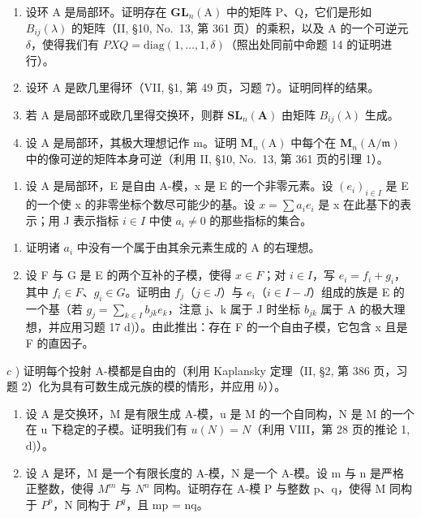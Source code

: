 \begin{enumerate}
\def\labelenumi{\alph{enumi})}
\item
  设环 A 是局部环。证明存在 \(\mathbf{GL}_{n}(\mathrm{A})\) 中的矩阵 P、Q，它们是形如 \(B_{ij}(\lambda)\) 的矩阵（II, §10, No.~13, 第 361 页）的乘积，以及 A 的一个可逆元 \(\delta\)，使得我们有 \(PXQ = \text{diag}(1, \ldots, 1, \delta)\)（照出处同前中命题 14 的证明进行）。
\item
  设环 A 是欧几里得环（VII, §1, 第 49 页，习题 7）。证明同样的结果。
\item
  若 \(\mathrm{A}\) 是局部环或欧几里得交换环，则群 \(\mathbf{S}\mathbf{L}_n(\mathbf{A})\) 由矩阵 \(B_{ij}(\lambda)\) 生成。
\item
  设 A 是局部环，其极大理想记作 m。证明 \(\mathbf{M}_{n}(\mathrm{A})\) 中每个在 \(\mathbf{M}_{n}(\mathrm{A}/\mathfrak{m})\) 中的像可逆的矩阵本身可逆（利用 II, §10, No.~13, 第 361 页的引理 1）。
\end{enumerate}

\begin{enumerate}
\def\labelenumi{\arabic{enumi})}
\setcounter{enumi}{17}
\tightlist
\item
  设 A 是局部环，E 是自由 A-模，x 是 E 的一个非零元素。设 \((e_{i})_{i\in I}\) 是 E 的一个使 x 的非零坐标个数尽可能少的基。设 \(x=\sum a_{i}e_{i}\) 是 x 在此基下的表示；用 J 表示指标 \(i\in I\) 中使 \(a_{i}\neq0\) 的那些指标的集合。
\end{enumerate}

\begin{enumerate}
\def\labelenumi{\alph{enumi})}
\tightlist
\item
  证明诸 \(a_{i}\) 中没有一个属于由其余元素生成的 A 的右理想。
\item
  设 F 与 G 是 E 的两个互补的子模，使得 \(x \in F\)；对 \(i \in I\)，写 \(e_{i} = f_{i} + g_{i}\)，其中 \(f_{i} \in F\)、\(g_{i} \in G\)。证明由 \(f_{j}\)（\(j \in J\)）与 \(e_{i}\)（\(i \in I - J\)）组成的族是 E 的一个基（若 \(g_{j} = \sum_{k \in I} b_{jk} e_{k}\)，注意 j、k 属于 J 时坐标 \(b_{jk}\) 属于 A 的极大理想，并应用习题 17 d)）。由此推出：存在 F 的一个自由子模，它包含 x 且是 F 的直因子。
\end{enumerate}

\(c\) ) 证明每个投射 A-模都是自由的（利用 Kaplansky 定理（II, §2, 第 386 页，习题 2）化为具有可数生成元族的模的情形，并应用 \(b\)））。

\begin{enumerate}
\def\labelenumi{\arabic{enumi})}
\setcounter{enumi}{18}
\item
  设 A 是交换环，M 是有限生成 A-模，u 是 M 的一个自同构，N 是 M 的一个在 u 下稳定的子模。证明我们有 \(u(N) = N\)（利用 VIII，第 28 页的推论 1, d)）。
\item
  设 A 是环，M 是一个有限长度的 A-模，N 是一个 A-模。设 m 与 n 是严格正整数，使得 \(M^{m}\) 与 \(N^{n}\) 同构。证明存在 A-模 P 与整数 p、q，使得 M 同构于 \(P^{p}\)，N 同构于 \(P^{q}\)，且 mp = nq。
\end{enumerate}

